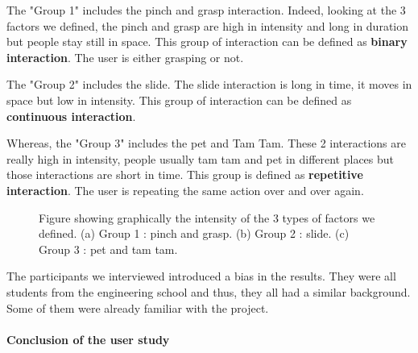 The "Group 1" includes the pinch and grasp interaction. Indeed, looking at the 3 factors we defined, 
the pinch and grasp are high in intensity and long in duration but people stay still in space.
This group of interaction can be defined as \textbf{binary interaction}. The user is either grasping or not.

The "Group 2" includes the slide. The slide interaction is long in time, it moves in space but low in intensity.
This group of interaction can be defined as \textbf{continuous interaction}.


Whereas, the "Group 3" includes the pet and Tam Tam. 
These 2 interactions are really high in intensity, people usually tam tam and pet in different places but those interactions are short in time. 
This group is defined as \textbf{repetitive interaction}. The user is repeating the same action over and over again.


\begin{figure}

    \begin{minipage}{.5\linewidth}
    \centering
    \end{minipage}%
    \begin{minipage}{.5\linewidth}
    \centering
    \end{minipage}\par\medskip
    \centering
    
    \caption{Figure showing graphically the intensity of the 3 types of factors we defined. (a) Group 1 : pinch and grasp. (b) Group 2 : slide. (c) Group 3 : pet and tam tam.}
    \label{fig:main}
    \end{figure}


The participants we interviewed introduced a bias in the results.
They were all students from the engineering school and thus, they all had a similar background.
Some of them were already familiar with the project.

\paragraph{Conclusion of the user study}


